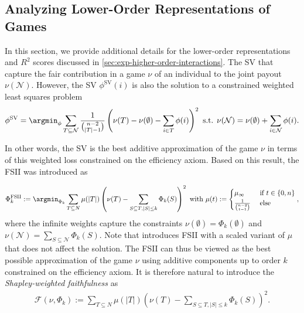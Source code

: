 \documentclass[letterpaper]{article} %
\begin{document}
\subsection{Analyzing Lower-Order Representations of Games}\label{appx_sec_fsii}
In this section, we provide additional details for the lower-order representations and $R^2$ scores discussed in \cref{sec:exp-higher-order-interactions}.
The \gls*{SV} that capture the fair contribution in a game $\nu$ of an individual to the joint payout $\nu(\mathcal N)$.
However, the \gls*{SV} $\phi^{\text{SV}}(i)$ is also the solution to a constrained weighted least squares problem \citep{Charnes.1988,DBLP:conf/icml/FumagalliMKHH24}
\begin{align*}
    \phi^{\text{SV}} = \argmin_{\phi} \sum_{T\subseteq \mathcal N} \frac{1}{\binom{n-2}{\vert T \vert - 1}} \left(\nu(T)-\nu(\emptyset)-\sum_{i \in T} \phi(i) \right)^2 \text{ s.t. } \nu(\mathcal N) = \nu(\emptyset) + \sum_{i \in \mathcal N} \phi(i).
\end{align*}

In other words, the \gls*{SV} is the best additive approximation of the game $\nu$ in terms of this weighted loss constrained on the efficiency axiom.
Based on this result, the \gls*{FSII} \citep{Tsai.2022} was introduced as 

\begin{align*}
    \Phi_k^{\text{FSII}} := \argmin_{\Phi_k} \sum_{T \subseteq N} \mu(\vert T \vert) \left(\nu(T) - \sum_{S \subseteq T, \vert S \vert \leq k} \Phi_k(S)\right)^2
    \text{ with } \mu(t) := \begin{cases}
        \mu_\infty &\text{ if } t \in \{0,n\} 
        \\
        \frac{1}{\binom{n-2}{t-1}} &\text{ else}
    \end{cases},
\end{align*}
where the infinite weights capture the constraints $\nu(\emptyset)=\Phi_k(\emptyset)$ and $\nu(\mathcal N) = \sum_{S \subseteq \mathcal N} \Phi_k(S)$.
Note that \cite{Tsai.2022} introduces \gls*{FSII} with a scaled variant of $\mu$ that does not affect the solution.
The \gls*{FSII} can thus be viewed as the best possible approximation of the game $\nu$ using additive components up to order $k$ constrained on the efficiency axiom.
It is therefore natural to introduce the \emph{Shapley-weighted faithfulness} as
\begin{align*}
    \mathcal F(\nu,\Phi_k) := \sum_{T \subseteq N} \mu(\vert T \vert) \left(\nu(T) - \sum_{S \subseteq T, \vert S \vert \leq k} \Phi_k(S)\right)^2.
\end{align*}
\end{document}
